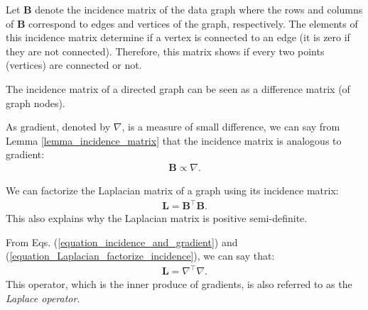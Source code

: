 \documentclass[lang=cn,10pt]{gorgeousnbook}
\numberwithin{equation}{section}%
\numberwithin{figure}{section}%
\begin{document}

Let $\boldsymbol{B}$ denote the incidence matrix of the data graph where the rows and columns of $\boldsymbol{B}$ correspond to edges and vertices of the graph, respectively. 
The elements of this incidence matrix determine if a vertex is connected to an edge (it is zero if they are not connected). Therefore, this matrix shows if every two points (vertices) are connected or not. 

\begin{lemma}\label{lemma_incidence_matrix}
The incidence matrix of a directed graph can be seen as a difference matrix (of graph nodes). 
\end{lemma}

\begin{corollary}
As gradient, denoted by $\nabla$, is a measure of small difference, we can say from Lemma \ref{lemma_incidence_matrix} that the incidence matrix is analogous to gradient:
\begin{align}\label{equation_incidence_and_gradient}
\boldsymbol{B} \propto \nabla.
\end{align}
\end{corollary}

\begin{lemma}
We can factorize the Laplacian matrix of a graph using its incidence matrix:
\begin{align}\label{equation_Laplacian_factorize_incidence}
\boldsymbol{L} = \boldsymbol{B}^\top \boldsymbol{B}.
\end{align}
This also explains why the Laplacian matrix is positive semi-definite. 
\end{lemma}

\begin{corollary}
From Eqs. (\ref{equation_incidence_and_gradient}) and (\ref{equation_Laplacian_factorize_incidence}), we can say that:
\begin{align}\label{equation_Laplacian_factorize_gradient}
\boldsymbol{L} = \nabla^\top \nabla.
\end{align}
This operator, which is the inner produce of gradients, is also referred to as the \textit{Laplace operator}.
\end{corollary}
\end{document}
